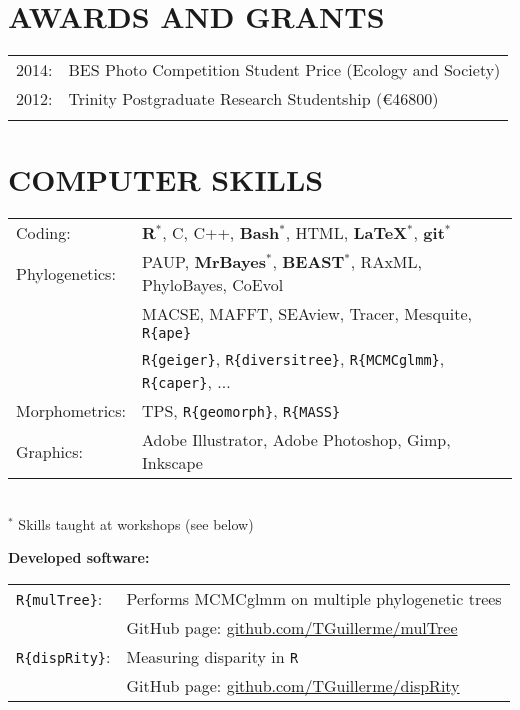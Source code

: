 \documentclass[10pt,a4paper]{article}
\begin{document}
{%

\section{AWARDS AND GRANTS}
\begin{tabular}{ll}
2014: & BES Photo Competition Student Price (Ecology and Society)\\
2012: & Trinity Postgraduate Research Studentship (\euro46800)\\
& \\ 
\end{tabular}
\bigskip

\section{COMPUTER SKILLS}
\begin{tabular}{ll}
Coding: & \textbf{{R}$^{*}$}, C, C++, \textbf{Bash$^{*}$}, HTML, \textbf{\LaTeX$^{*}$}, \textbf{git$^{*}$}\\[1.5ex]
Phylogenetics: & PAUP, \textbf{MrBayes$^{*}$}, \textbf{BEAST$^{*}$}, RAxML, PhyloBayes, CoEvol \\
& MACSE, MAFFT, SEAview, Tracer, Mesquite, \texttt{R\{ape\}} \\
& \texttt{R\{geiger\}}, \texttt{R\{diversitree\}}, \texttt{R\{MCMCglmm\}}, \texttt{R\{caper\}}, ... \\[1.5ex]
Morphometrics: & TPS, \texttt{R\{geomorph\}}, \texttt{R\{MASS\}} \\[1.5ex]
Graphics: & Adobe Illustrator, Adobe Photoshop, Gimp, Inkscape\\[1.5ex]
\end{tabular} \\
$^{*}$ Skills taught at workshops (see below)
\bigskip

\raggedright\textbf{Developed software:}\\[1.5ex]
\begin{tabular}{ll}
\texttt{R\{mulTree\}}: & Performs MCMCglmm on multiple phylogenetic trees \\
                       & GitHub page: \href{https://github.com/TGuillerme/mulTree}{github.com/TGuillerme/mulTree} \\
\texttt{R\{dispRity\}}: & Measuring disparity in \texttt{R} \\
                       & GitHub page: \href{https://github.com/TGuillerme/dispRity}{github.com/TGuillerme/dispRity}
\end{tabular} \\


}
\end{document}
